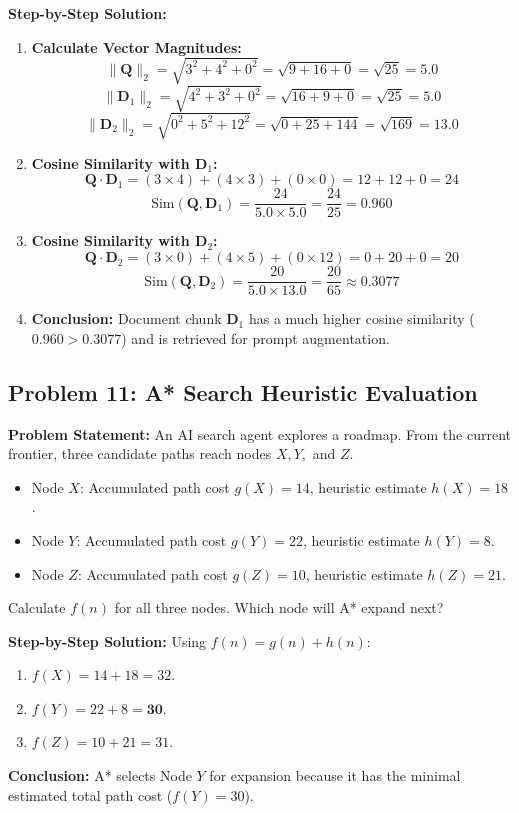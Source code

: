\textbf{Step-by-Step Solution:}
\begin{enumerate}[label=\arabic*.]
    \item \textbf{Calculate Vector Magnitudes:}
    \[
    \|\mathbf{Q}\|_2 = \sqrt{3^2 + 4^2 + 0^2} = \sqrt{9 + 16 + 0} = \sqrt{25} = 5.0
    \]
    \[
    \|\mathbf{D}_1\|_2 = \sqrt{4^2 + 3^2 + 0^2} = \sqrt{16 + 9 + 0} = \sqrt{25} = 5.0
    \]
    \[
    \|\mathbf{D}_2\|_2 = \sqrt{0^2 + 5^2 + 12^2} = \sqrt{0 + 25 + 144} = \sqrt{169} = 13.0
    \]
    \item \textbf{Cosine Similarity with $\mathbf{D}_1$:}
    \[
    \mathbf{Q} \cdot \mathbf{D}_1 = (3 \times 4) + (4 \times 3) + (0 \times 0) = 12 + 12 + 0 = 24
    \]
    \[
    \text{Sim}(\mathbf{Q}, \mathbf{D}_1) = \frac{24}{5.0 \times 5.0} = \frac{24}{25} = \mathbf{0.960}
    \]
    \item \textbf{Cosine Similarity with $\mathbf{D}_2$:}
    \[
    \mathbf{Q} \cdot \mathbf{D}_2 = (3 \times 0) + (4 \times 5) + (0 \times 12) = 0 + 20 + 0 = 20
    \]
    \[
    \text{Sim}(\mathbf{Q}, \mathbf{D}_2) = \frac{20}{5.0 \times 13.0} = \frac{20}{65} \approx \mathbf{0.3077}
    \]
    \item \textbf{Conclusion:} Document chunk $\mathbf{D}_1$ has a much higher cosine similarity ($0.960 > 0.3077$) and is retrieved for prompt augmentation.
\end{enumerate}

\subsection*{Problem 11: A* Search Heuristic Evaluation}
\textbf{Problem Statement:} An AI search agent explores a roadmap. From the current frontier, three candidate paths reach nodes $X, Y,$ and $Z$.
\begin{itemize}
    \item Node $X$: Accumulated path cost $g(X) = 14$, heuristic estimate $h(X) = 18$.
    \item Node $Y$: Accumulated path cost $g(Y) = 22$, heuristic estimate $h(Y) = 8$.
    \item Node $Z$: Accumulated path cost $g(Z) = 10$, heuristic estimate $h(Z) = 21$.
\end{itemize}
Calculate $f(n)$ for all three nodes. Which node will A* expand next?

\textbf{Step-by-Step Solution:}
Using $f(n) = g(n) + h(n)$:
\begin{enumerate}[label=\arabic*.]
    \item $f(X) = 14 + 18 = 32$.
    \item $f(Y) = 22 + 8 = \mathbf{30}$.
    \item $f(Z) = 10 + 21 = 31$.
\end{enumerate}
\textbf{Conclusion:} A* selects Node $Y$ for expansion because it has the minimal estimated total path cost ($f(Y) = 30$).

